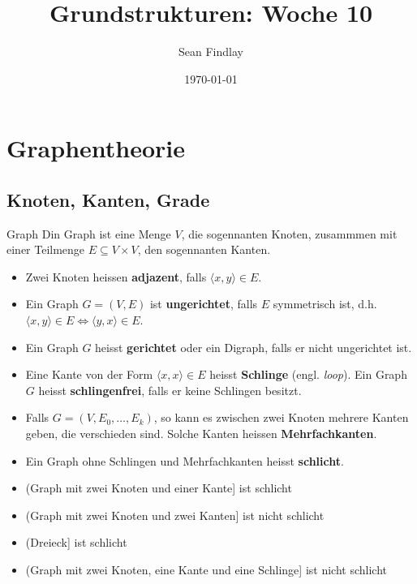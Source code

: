 \documentclass[12pt]{article}
\title{Grundstrukturen: Woche 10}
\author{Sean Findlay}
\date{\today}
\begin{document}
\maketitle

\section{Graphentheorie}

\subsection{Knoten, Kanten, Grade}

\begin{definition}{Graph}{}
    Din Graph ist eine Menge $V$, die sogennanten Knoten, zusammmen mit einer Teilmenge $E \subseteq V \times V$, den sogennanten Kanten.

    \begin{itemize}
        \item Zwei Knoten heissen \textbf{adjazent}, falls $\langle x, y \rangle \in E$.
        \item Ein Graph $G = (V, E)$ ist \textbf{ungerichtet}, falls $E$ symmetrisch ist, d.h. $\langle x, y \rangle \in E \iff \langle y, x \rangle \in E$.
        \item Ein Graph $G$ heisst \textbf{gerichtet} oder ein Digraph, falls er nicht ungerichtet ist.
        \item Eine Kante von der Form $\langle x, x \rangle \in E$ heisst \textbf{Schlinge} (engl. \textit{loop}). Ein Graph $G$ heisst \textbf{schlingenfrei}, falls er keine Schlingen besitzt.
        \item Falls $G = (V, E_0, \dots, E_k)$, so kann es zwischen zwei Knoten mehrere Kanten geben, die verschieden sind. Solche Kanten heissen \textbf{Mehrfachkanten}.
        \item Ein Graph ohne Schlingen und Mehrfachkanten heisst \textbf{schlicht}.
    \end{itemize}
\end{definition}

\begin{example}{}{}
    \begin{itemize}
        \item (Graph mit zwei Knoten und einer Kante] ist schlicht
        \item (Graph mit zwei Knoten und zwei Kanten] ist nicht schlicht
        \item (Dreieck] ist schlicht
        \item (Graph mit zwei Knoten, eine Kante und eine Schlinge] ist nicht schlicht
    \end{itemize}
\end{example}
\end{document}
